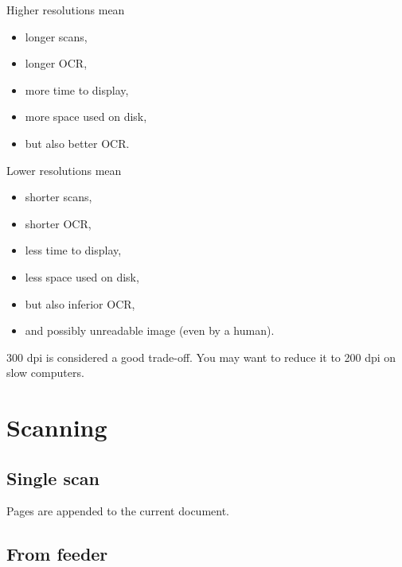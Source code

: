 \documentclass[10pt,a4paper]{article}
\begin{document}
Higher resolutions mean
\begin{itemize}
\item longer scans,
\item longer OCR,
\item more time to display,
\item more space used on disk,
\item but also better OCR.
\end{itemize}
Lower resolutions mean
\begin{itemize}
\item shorter scans,
\item shorter OCR,
\item less time to display,
\item less space used on disk,
\item but also inferior OCR,
\item and possibly unreadable image (even by a human).
\end{itemize}
300 dpi is considered a good trade-off. You may want to reduce it
to 200 dpi on slow computers.

\section{Scanning}

\subsection{Single scan}


Pages are appended to the current document.

\subsection{\label{subsec:From-feeder}From feeder}

\end{document}
